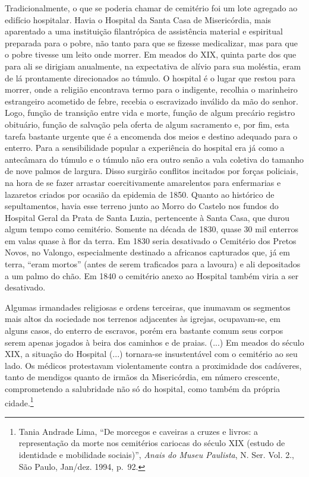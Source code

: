 Tradicionalmente, o que se poderia chamar de cemitério foi um lote
agregado ao edifício hospitalar. Havia o Hospital da Santa Casa de
Misericórdia, mais aparentado a uma instituição filantrópica de
assistência material e espiritual preparada para o pobre, não tanto para
que se fizesse medicalizar, mas para que o pobre tivesse um leito onde
morrer. Em meados do XIX, quinta parte dos que para ali se dirigiam
anualmente, na expectativa de alívio para sua moléstia, eram de lá
prontamente direcionados ao túmulo. O hospital é o lugar que restou para
morrer, onde a religião encontrava termo para o indigente, recolhia o
marinheiro estrangeiro acometido de febre, recebia o escravizado
inválido da mão do senhor. Logo, função de transição entre vida e morte,
função de algum precário registro obituário, função de salvação pela
oferta de algum sacramento e, por fim, esta tarefa bastante urgente que
é a encomenda dos meios e destino adequado para o enterro. Para a
sensibilidade popular a experiência do hospital era já como a antecâmara
do túmulo e o túmulo não era outro senão a vala coletiva do tamanho de
nove palmos de largura. Disso surgirão conflitos incitados por forças
policiais, na hora de se fazer arrastar coercitivamente amarelentos para
enfermarias e lazaretos criados por ocasião da epidemia de 1850. Quanto
ao histórico de sepultamentos, havia esse terreno junto ao Morro do
Castelo nos fundos do Hospital Geral da Prata de Santa Luzia,
pertencente à Santa Casa, que durou algum tempo como cemitério. Somente
na década de 1830, quase 30 mil enterros em valas quase à flor da terra.
Em 1830 seria desativado o Cemitério dos Pretos Novos, no Valongo,
especialmente destinado a africanos capturados que, já em terra, ``eram
mortos'' (antes de serem traficados para a lavoura) e ali depositados a
um palmo do chão. Em 1840 o cemitério anexo ao Hospital também viria a
ser desativado.

Algumas irmandades religiosas e ordens terceiras, que inumavam os
segmentos mais altos da sociedade nos terrenos adjacentes às igrejas,
ocupavam-se, em alguns casos, do enterro de escravos, porém era bastante
comum seus corpos serem apenas jogados à beira dos caminhos e de praias.
(...) Em meados do século XIX, a situação do Hospital (...) tornara-se
insustentável com o cemitério ao seu lado. Os médicos protestavam
violentamente contra a proximidade dos cadáveres, tanto de mendigos
quanto de irmãos da Misericórdia, em número crescente, comprometendo a
salubridade não só do hospital, como também da própria cidade.\footnote{Tania
  Andrade Lima, ``De morcegos e caveiras a cruzes e livros: a
  representação da morte nos cemitérios cariocas do século XIX (estudo
  de identidade e mobilidade sociais)'', \emph{Anais do Museu Paulista},
  N. Ser. Vol. 2., São Paulo, Jan/dez. 1994, p.~92.}

